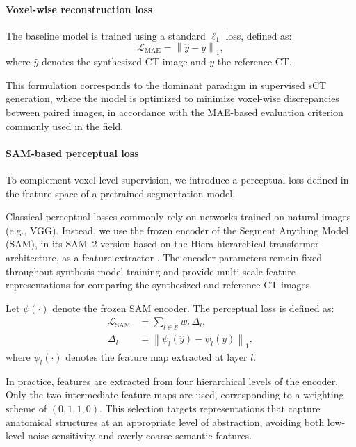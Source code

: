 \documentclass[lettersize,journal]{IEEEtran}
\begin{document}
\paragraph{Voxel-wise reconstruction loss}
The baseline model is trained using a standard $\ell_1$ loss, defined as:
\begin{equation}
\mathcal{L}_{\text{MAE}} = \left\| \hat{y} - y \right\|_1,
\end{equation}
where $\hat{y}$ denotes the synthesized CT image and $y$ the reference CT.

This formulation corresponds to the dominant paradigm in supervised sCT generation, where the model is optimized to minimize voxel-wise discrepancies between paired images, in accordance with the MAE-based evaluation criterion commonly used in the field.

\paragraph{SAM-based perceptual loss}
To complement voxel-level supervision, we introduce a perceptual loss defined in the feature space of a pretrained segmentation model.

Classical perceptual losses commonly rely on networks trained on natural images (e.g., VGG). Instead, we use the frozen encoder of the Segment Anything Model (SAM), in its SAM~2 version based on the Hiera hierarchical transformer architecture, as a feature extractor \cite{ravi2024sam2}. The encoder parameters remain fixed throughout synthesis-model training and provide multi-scale feature representations for comparing the synthesized and reference CT images.

Let $\psi(\cdot)$ denote the frozen SAM encoder. The perceptual loss is defined as:
\begin{equation}
\begin{aligned}
\mathcal{L}_{\text{SAM}}
&= \sum_{l \in \mathcal{S}} w_l\,\Delta_l, \\
\Delta_l
&= \left\| \psi_l(\hat{y}) - \psi_l(y) \right\|_1 ,
\end{aligned}
\end{equation}
where $\psi_l(\cdot)$ denotes the feature map extracted at layer $l$.

In practice, features are extracted from four hierarchical levels of the encoder. 
Only the two intermediate feature maps are used, corresponding to a weighting scheme of $(0, 1, 1, 0)$. 
This selection targets representations that capture anatomical structures at an appropriate level of abstraction, avoiding both low-level noise sensitivity and overly coarse semantic features.
\end{document}
